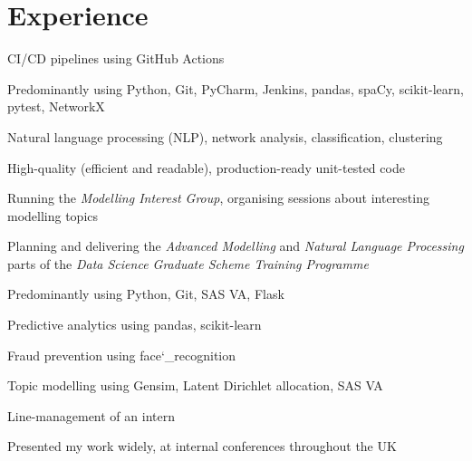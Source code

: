 \documentclass[]{cv-template}
\begin{document}
\hfill
\begin{minipage}[t]{0.66\textwidth} 


\section{Experience}

\vspace{\topsep} %
\begin{tightemize}
\item CI/CD pipelines using GitHub Actions
\end{tightemize}

\sectionsep

\begin{tightemize}
\item Predominantly using Python, Git, PyCharm, Jenkins, pandas, spaCy, scikit-learn, pytest, NetworkX
\item Natural language processing (NLP), network analysis, classification, clustering
\item High-quality (efficient and readable), production-ready unit-tested code
\item Running the \textit{Modelling Interest Group}, organising sessions about interesting modelling topics
\item Planning and delivering the \textit{Advanced Modelling} and \textit{Natural Language Processing} parts of the \textit{Data Science Graduate Scheme Training Programme}
\end{tightemize}

\sectionsep

\begin{tightemize}
\item Predominantly using Python, Git, SAS VA, Flask
\item Predictive analytics using pandas, scikit-learn
\item Fraud prevention using face\char`_recognition
\item Topic modelling using Gensim, Latent Dirichlet allocation, SAS VA
\item Line-management of an intern
\item Presented my work widely, at internal conferences throughout the UK
\end{tightemize}
\sectionsep


\end{minipage}
\end{document}
